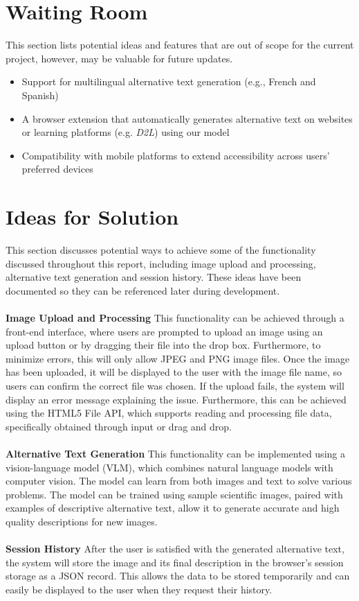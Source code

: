 \documentclass[12pt]{article}
\begin{document}
\section{Waiting Room}
This section lists potential ideas and features that are out of scope for the current project, however, may be valuable for future updates. 
\begin{itemize}
  \item Support for multilingual alternative text generation (e.g., French and Spanish)
  \item A browser extension that automatically generates alternative text on websites or learning platforms (e.g. \textit{D2L}) using our model
  \item Compatibility with mobile platforms to extend accessibility across users' preferred devices
\end{itemize}

\section{Ideas for Solution}
This section discusses potential ways to achieve some of the functionality discussed throughout this report, 
including image upload and processing, alternative text generation and session history. 
These ideas have been documented so they can be referenced later during development.\\
\\
\textbf{Image Upload and Processing}
This functionality can be achieved through a front-end interface, where users are prompted to upload an image using an upload button or by dragging their file into the drop box. Furthermore, to minimize errors, this will only allow JPEG and PNG image files. 
Once the image has been uploaded, it will be displayed to the user with the image file name, so users can confirm the correct file was chosen. 
If the upload fails, the system will display an error message explaining the issue. Furthermore, this can be achieved using the HTML5 File API, which supports reading and processing file data, specifically obtained through input or drag and drop. \\
\\
\textbf{Alternative Text Generation}
This functionality can be implemented using a vision-language model (VLM), which combines natural language models with computer vision. 
The model can learn from both images and text to solve various problems. The model can be trained using sample scientific images, paired with examples of descriptive alternative text, allow it to generate accurate and high quality descriptions for new images.\\
\\
\textbf{Session History}
After the user is satisfied with the generated alternative text, the system will store the image and its final description in the browser's session storage as a JSON record. This allows the data to be stored temporarily and can easily be displayed to the user when they request their history. \\
\end{document}
